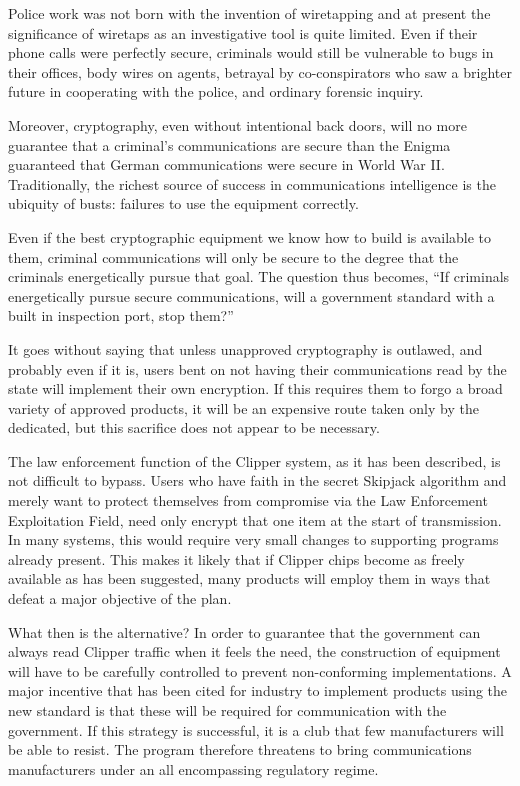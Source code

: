 \para Police work was not born with the invention of wiretapping and
at present the significance of wiretaps as an investigative tool is
quite limited.  Even if their phone calls were perfectly secure,
criminals would still be vulnerable to bugs in their offices, body
wires on agents, betrayal by co-conspirators who saw a brighter future
in cooperating with the police, and ordinary forensic inquiry.
\endpara

\para Moreover, cryptography, even without intentional back doors,
will no more guarantee that a criminal's communications are secure
than the Enigma guaranteed that German communications were secure
in World War II.  Traditionally, the richest source of success in
communications intelligence is the ubiquity of busts: failures to
use the equipment correctly.  \endpara

\para Even if the best cryptographic equipment we know how to build
is available to them, criminal communications will only be secure to
the degree that the criminals energetically pursue that goal.  The
question thus becomes, ``If criminals energetically pursue secure
communications, will a government standard with a built in inspection
port, stop them?'' \endpara

\para It goes without saying that unless unapproved cryptography is
outlawed, and probably even if it is, users bent on not having their
communications read by the state will implement their own encryption.
If this requires them to forgo a broad variety of approved products,
it will be an expensive route taken only by the dedicated, but this
sacrifice does not appear to be necessary. \endpara

\para The law enforcement function of the Clipper system, as it has
been described, is not difficult to bypass.  Users who have faith in
the secret Skipjack algorithm and merely want to protect themselves
from compromise via the Law Enforcement Exploitation Field, need only
encrypt that one item at the start of transmission.  In many systems,
this would require very small changes to supporting programs already
present.  This makes it likely that if Clipper chips become as freely
available as has been suggested, many products will employ them in
ways that defeat a major objective of the plan. \endpara

\para What then is the alternative?  In order to guarantee that
the government can always read Clipper traffic when it feels the need,
the construction of equipment will have to be carefully controlled
to prevent non-conforming implementations.  A major incentive that
has been cited for industry to implement products using the new
standard is that these will be required for communication with the
government.  If this strategy is successful, it is a club that few
manufacturers will be able to resist.  The program therefore threatens
to bring communications manufacturers under an all encompassing
regulatory regime. \endpara

